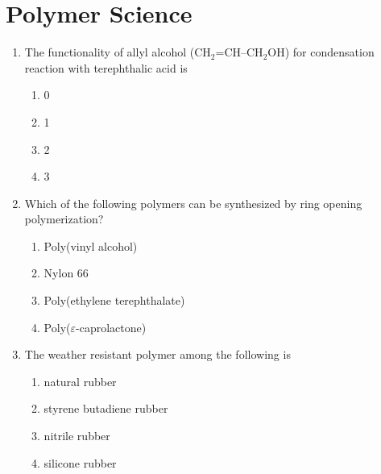 \documentclass[journal,12pt,onecolumn]{IEEEtran}
\begin{document}
\section*{Polymer Science}
\noindent
\vspace{1cm}
\begin{enumerate}[label=\arabic*)]

\item The functionality of allyl alcohol (CH$_2$=CH--CH$_2$OH) for condensation reaction with terephthalic acid is
\hfill{} \\

\vspace{0.2cm}
\begin{enumerate}[label=\alph*)]
\item 0
\item 1
\item 2
\item 3
\end{enumerate}

\vspace{0.5cm}

\item Which of the following polymers can be synthesized by ring opening polymerization?
\hfill{} \\

\vspace{0.2cm}
\begin{enumerate}[label=\alph*)]
\item Poly(vinyl alcohol)
\item Nylon 66
\item Poly(ethylene terephthalate)
\item Poly($\varepsilon$-caprolactone)
\end{enumerate}

\vspace{0.5cm}

\item The weather resistant polymer among the following is
\hfill{} \\

\vspace{0.2cm}
\begin{enumerate}[label=\alph*)]
\item natural rubber
\item styrene butadiene rubber
\item nitrile rubber
\item silicone rubber
\end{enumerate}


\end{enumerate}
\end{document}
